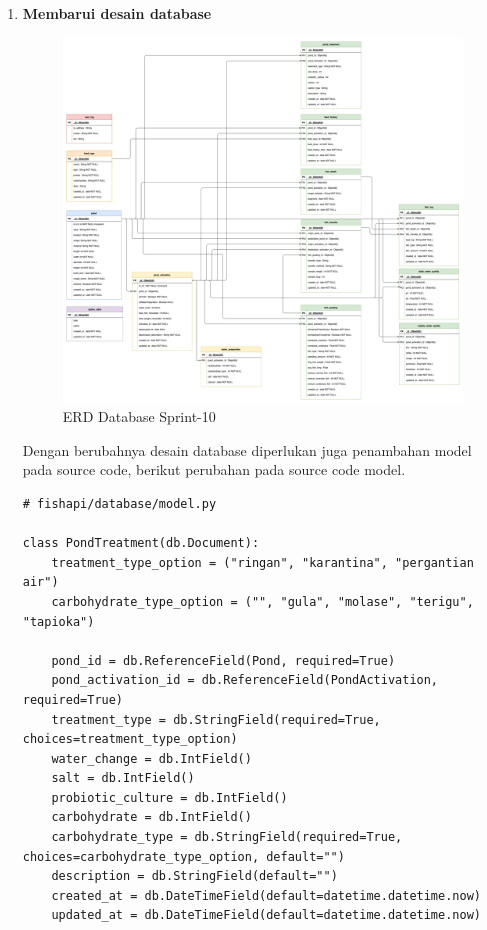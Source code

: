 \begin{enumerate}[1.]

\item \textbf{Membarui desain database}

\begin{figure}[H]
	\centering
	\includegraphics[height=0.7\textwidth]{gambar/Sprint10/diagram database/database}
	\caption{ERD Database Sprint-10}
	\label{fig:database_sprint10}
\end{figure}

Dengan berubahnya desain database diperlukan juga penambahan model pada source code, berikut perubahan pada source code model.

\begin{lstlisting}
# fishapi/database/model.py

class PondTreatment(db.Document):
    treatment_type_option = ("ringan", "karantina", "pergantian air")
    carbohydrate_type_option = ("", "gula", "molase", "terigu", "tapioka")

    pond_id = db.ReferenceField(Pond, required=True)
    pond_activation_id = db.ReferenceField(PondActivation, required=True)
    treatment_type = db.StringField(required=True, choices=treatment_type_option)
    water_change = db.IntField()
    salt = db.IntField()
    probiotic_culture = db.IntField()
    carbohydrate = db.IntField()
    carbohydrate_type = db.StringField(required=True, choices=carbohydrate_type_option, default="")
    description = db.StringField(default="")
    created_at = db.DateTimeField(default=datetime.datetime.now)
    updated_at = db.DateTimeField(default=datetime.datetime.now)
\end{lstlisting}




\end{enumerate}
